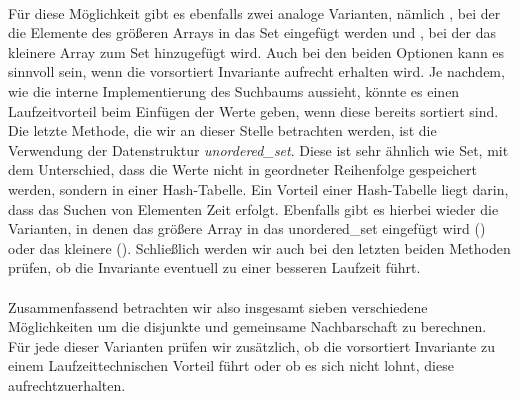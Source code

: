 \\
Für diese Möglichkeit gibt es ebenfalls zwei 
analoge Varianten, nämlich \SetSea, bei der die Elemente des größeren Arrays in das Set eingefügt werden
und \SeaSet, bei der das kleinere Array zum Set hinzugefügt wird.
Auch bei den beiden Optionen kann es sinnvoll sein, wenn die vorsortiert Invariante aufrecht erhalten wird. Je
nachdem, wie die interne Implementierung des Suchbaums aussieht, könnte es einen Laufzeitvorteil beim Einfügen
der Werte geben, wenn
diese bereits sortiert sind.
\\
Die letzte Methode, die wir an dieser Stelle betrachten werden,
ist die Verwendung der Datenstruktur \textit{unordered\_set}. Diese ist sehr ähnlich wie Set, mit
dem Unterschied, dass die Werte nicht in geordneter Reihenfolge gespeichert werden, sondern
in einer Hash-Tabelle. Ein Vorteil einer Hash-Tabelle liegt darin, dass das Suchen von Elementen
 Zeit erfolgt.
Ebenfalls gibt es hierbei wieder die Varianten, 
in denen das größere Array in das unordered\_set eingefügt wird (\USetSea) 
oder das kleinere (\SeaUSet).{}
Schließlich werden wir auch bei den letzten beiden Methoden prüfen,
 ob die Invariante eventuell zu einer besseren Laufzeit führt.
\\
\\
Zusammenfassend betrachten wir also insgesamt sieben verschiedene Möglichkeiten um die disjunkte
und gemeinsame Nachbarschaft zu berechnen. Für jede dieser Varianten prüfen wir zusätzlich,
ob die vorsortiert Invariante zu einem Laufzeittechnischen Vorteil führt oder ob es sich
nicht lohnt, diese aufrechtzuerhalten.



